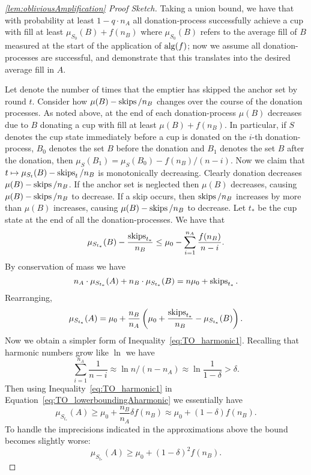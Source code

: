 \begin{proof}[\cref{lem:obliviousAmplification} Proof Sketch]
  Taking a union bound, we have that with probability at least
  $1- q \cdot n_A$ all donation-process successfully achieve a cup
  with fill at least $\mu_{S_0}(B) + f(n_B)$ where $\mu_{S_0}(B)$
  refers to the average fill of $B$ measured at the start of the
  application of $\operatorname{\text{\textup{alg}}}(f)$; now we assume all donation-processes
  are successful, and demonstrate that this translates into the
  desired average fill in $A$.

  Let  denote the number of times that the
  emptier has skipped the anchor set by round $t$. Consider how
  $\mu(B) - \operatorname{\text{\textup{skips}}}/n_B$ changes over the course of the donation
  processes. As noted above, at the end of each donation-process
  $\mu(B)$ decreases due to $B$ donating a cup with fill at least
  $\mu(B) + f(n_B)$. In particular, if $S$ denotes the cup state
  immediately before a cup is donated on the $i$-th
  donation-process, $B_0$ denotes the set $B$ before
  the donation and $B_1$ denotes the set $B$ after the donation,
  then $\mu_{S}(B_1) = \mu_{S}(B_0) - f(n_B) / (n-i)$. Now we claim that
  $t\mapsto \mu_{S_t}(B) - \operatorname{\text{\textup{skips}}}_t/n_B$ is monotonically decreasing. 
  Clearly donation decreases $\mu(B) - \operatorname{\text{\textup{skips}}}/n_B$. 
  If the anchor set is neglected then $\mu(B)$ decreases, causing
  $\mu(B) - \operatorname{\text{\textup{skips}}}/n_B$ to decrease. 
  If a skip occurs, then $\operatorname{\text{\textup{skips}}}/n_B$ increases by more than
  $\mu(B)$ increases, causing $\mu(B)-\operatorname{\text{\textup{skips}}}/n_B$ to decrease. 
  Let $t_*$ be the cup state at the end of all the
  donation-processes. We have that 
  \begin{equation}
    \label{eq:TO_harmonic1}
    \mu_{S_{t_*}}(B) - \frac{\operatorname{\text{\textup{skips}}}_{t_*}}{n_B} \le \mu_0 - \sum_{i=1}^{n_A}\frac{f(n_B)}{n-i}.
  \end{equation}
  By conservation of mass we have 
  $$n_A\cdot \mu_{S_{t_*}}(A) + n_B\cdot \mu_{S_{t_*}}(B) = n\mu_0 + \operatorname{\text{\textup{skips}}}_{t_*}.$$
  Rearranging, 
  \begin{equation}
    \label{eq:TO_lowerboundingAharmonic}
    \mu_{S_{t_*}}(A) = \mu_0 + \frac{n_B}{n_A}\left( \mu_0 +
    \frac{\operatorname{\text{\textup{skips}}}_{t_*}}{n_B} - \mu_{S_{t_*}}(B) \right).
  \end{equation}
  Now we obtain a simpler form of
  Inequality~\eqref{eq:TO_harmonic1}. Recalling that harmonic
  numbers grow like $\ln$ we have
  $$\sum_{i=1}^{n_A} \frac{1}{n-i} \approx \ln n/(n-n_A) \approx
  \ln \frac{1}{1-\delta} > \delta.$$
  Then using Inequality~\eqref{eq:TO_harmonic1} in
  Equation~\ref{eq:TO_lowerboundingAharmonic} we essentially have
  $$\mu_{S_{t_*}}(A) \ge \mu_0 + \frac{n_B}{n_A} \delta f(n_B)
  \approx \mu_0 + (1-\delta) f(n_B).$$
  To handle the imprecisions indicated in the
  approximations above the bound becomes slightly worse:
  $$\mu_{S_{t_*}}(A) \ge \mu_0 + (1-\delta)^2 f(n_B).$$


\end{proof}
